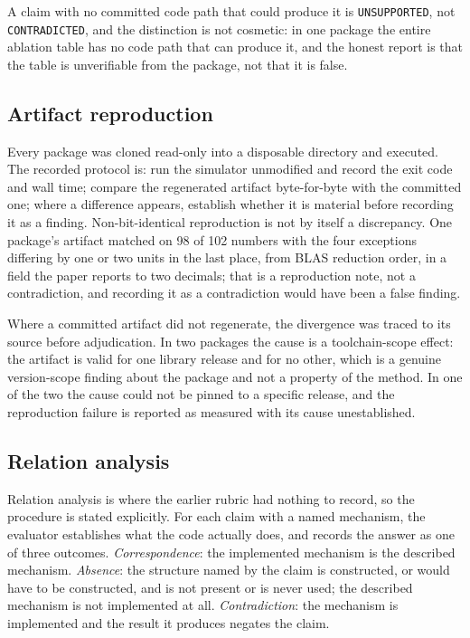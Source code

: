 \documentclass[sigconf,review]{acmart}
\begin{document}
A claim with no committed code path that could produce it is
\texttt{UNSUPPORTED}, not \texttt{CONTRADICTED}, and the distinction is not
cosmetic: in one package the entire ablation table has no code path that can
produce it, and the honest report is that the table is unverifiable from the
package, not that it is false.

\subsection{Artifact reproduction}
\label{sec:method-repro}

Every package was cloned read-only into a disposable directory and executed.
The recorded protocol is: run the simulator unmodified and record the exit
code and wall time; compare the regenerated artifact byte-for-byte with the
committed one; where a difference appears, establish whether it is material
before recording it as a finding. Non-bit-identical reproduction is not by
itself a discrepancy. One package's artifact matched on 98 of 102 numbers with
the four exceptions differing by one or two units in the last place, from BLAS
reduction order, in a field the paper reports to two decimals; that is a
reproduction note, not a contradiction, and recording it as a contradiction
would have been a false finding.

Where a committed artifact did not regenerate, the divergence was traced to
its source before adjudication. In two packages the cause is a
toolchain-scope effect: the artifact is valid for one library release and for
no other, which is a genuine version-scope finding about the package and not a
property of the method. In one of the two the cause could not be pinned to a
specific release, and the reproduction failure is reported as measured with
its cause unestablished.

\subsection{Relation analysis}
\label{sec:method-relation}

Relation analysis is where the earlier rubric had nothing to record, so the
procedure is stated explicitly. For each claim with a named mechanism, the
evaluator establishes what the code actually does, and records the answer as
one of three outcomes. \emph{Correspondence}: the implemented mechanism is the
described mechanism. \emph{Absence}: the structure named by the claim is
constructed, or would have to be constructed, and is not present or is never
used; the described mechanism is not implemented at all. \emph{Contradiction}:
the mechanism is implemented and the result it produces negates the claim.
\end{document}
